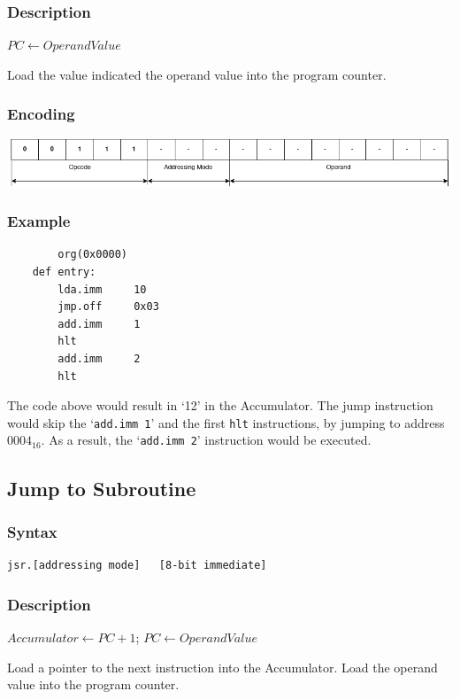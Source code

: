     \subsubsection{Description}
    $PC \leftarrow OperandValue$
    \par Load the value indicated the operand value into the program counter.

    \subsubsection{Encoding}
    \begin{center}
        \includegraphics[scale=0.40]{img/Andromeda-JMP.drawio}
    \end{center}

    \subsubsection{Example}
    \begin{verbatim}
        org(0x0000)
    def entry:
        lda.imm     10
        jmp.off     0x03
        add.imm     1
        hlt
        add.imm     2
        hlt
    \end{verbatim}
    \par The code above would result in `12' in the Accumulator.
    The jump instruction would skip the `\texttt{add.imm 1}'  and  the first \texttt{hlt} instructions, by jumping to address $0004_{16}$.
    As a result, the `\texttt{add.imm 2}' instruction would be executed.

\pagebreak
\subsection{Jump to Subroutine}\label{subsec:jsr}
    \subsubsection{Syntax}
    \begin{verbatim}jsr.[addressing mode]   [8-bit immediate]\end{verbatim}
    \subsubsection{Description}
    $Accumulator \leftarrow PC + 1$; $PC \leftarrow OperandValue$
    \par Load a pointer to the next instruction into the Accumulator.
    Load the operand value into the program counter.
